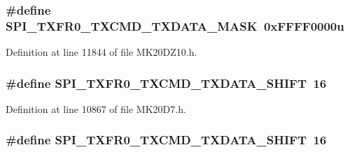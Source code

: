 \subsubsection[{\texorpdfstring{S\+P\+I\+\_\+\+T\+X\+F\+R0\+\_\+\+T\+X\+C\+M\+D\+\_\+\+T\+X\+D\+A\+T\+A\+\_\+\+M\+A\+SK}{SPI_TXFR0_TXCMD_TXDATA_MASK}}]{\setlength{\rightskip}{0pt plus 5cm}\#define S\+P\+I\+\_\+\+T\+X\+F\+R0\+\_\+\+T\+X\+C\+M\+D\+\_\+\+T\+X\+D\+A\+T\+A\+\_\+\+M\+A\+SK~0x\+F\+F\+F\+F0000u}\hypertarget{group___s_p_i___register___masks_ga2d7e46a45e284b2a837f0dfa4103c9cc}{}\label{group___s_p_i___register___masks_ga2d7e46a45e284b2a837f0dfa4103c9cc}


Definition at line 11844 of file M\+K20\+D\+Z10.\+h.

\subsubsection[{\texorpdfstring{S\+P\+I\+\_\+\+T\+X\+F\+R0\+\_\+\+T\+X\+C\+M\+D\+\_\+\+T\+X\+D\+A\+T\+A\+\_\+\+S\+H\+I\+FT}{SPI_TXFR0_TXCMD_TXDATA_SHIFT}}]{\setlength{\rightskip}{0pt plus 5cm}\#define S\+P\+I\+\_\+\+T\+X\+F\+R0\+\_\+\+T\+X\+C\+M\+D\+\_\+\+T\+X\+D\+A\+T\+A\+\_\+\+S\+H\+I\+FT~16}\hypertarget{group___s_p_i___register___masks_gad5b1e75e9410e41d3c81384798040284}{}\label{group___s_p_i___register___masks_gad5b1e75e9410e41d3c81384798040284}


Definition at line 10867 of file M\+K20\+D7.\+h.

\subsubsection[{\texorpdfstring{S\+P\+I\+\_\+\+T\+X\+F\+R0\+\_\+\+T\+X\+C\+M\+D\+\_\+\+T\+X\+D\+A\+T\+A\+\_\+\+S\+H\+I\+FT}{SPI_TXFR0_TXCMD_TXDATA_SHIFT}}]{\setlength{\rightskip}{0pt plus 5cm}\#define S\+P\+I\+\_\+\+T\+X\+F\+R0\+\_\+\+T\+X\+C\+M\+D\+\_\+\+T\+X\+D\+A\+T\+A\+\_\+\+S\+H\+I\+FT~16}\hypertarget{group___s_p_i___register___masks_gad5b1e75e9410e41d3c81384798040284}{}\label{group___s_p_i___register___masks_gad5b1e75e9410e41d3c81384798040284}


